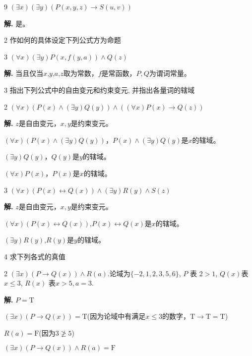 \documentclass[12pt]{article}
\newenvironment{firstlayer}%
{\begin{list}{}{\renewcommand{\makelabel}[1]{\textbf{##1}.\hfil}
}}
{\end{list}}
\newenvironment{secondlayer}%
{\begin{list}{}{\renewcommand{\makelabel}[1]{(##1)\hfil}
}}
{\end{list}}
\begin{document}
\begin{CJK}{UTF8}{gbsn}
\begin{firstlayer}
\begin{secondlayer}
    \item[9] \(( \exists x ) ( \exists y ) ( P ( x , y , z ) \rightarrow S( u , v) )\)

    \textbf{解.} 是。
  \end{secondlayer}
  \item[2] 作如何的具体设定下列公式方为命题

  \begin{secondlayer}
    \item[3] \(( \forall x ) ( \exists y ) P ( x , f ( y , a ) ) \wedge Q( z)\)

\textbf{解.} 当且仅当\(x\),\(y\),\(a\),\(z\)取为常数，\(f\)是常函数，\(P,Q\)为谓词常量。
  \end{secondlayer}
  \item[3] 指出下列公式中的自由变元和约束变元, 并指出各量词的辖域

  \begin{secondlayer}
    \item[2] \(( \forall x ) ( P ( x ) \wedge ( \exists y )Q( y ) ) \wedge ( ( \forall x ) P ( x ) \rightarrow Q( z) )\)

    \textbf{解.} \(z\)是自由变元，\(x,y\)是约束变元。

\(( \forall x ) ( P ( x ) \wedge ( \exists y )Q( y ) )\)，\(P ( x ) \wedge ( \exists y )Q( y )\)是\(x\)的辖域。

\(( \exists y )Q( y )\)，\(Q( y )\)是\(y\)的辖域。

\(( \forall x ) P ( x )\)，\(P ( x )\)是\(x\)的辖域。

    \item[3] \(( \forall x ) ( P ( x ) \leftrightarrow Q( x ) ) \wedge ( \exists y ) R( y ) \wedge S( z)\)

    \textbf{解.} \(z\)是自由变元，\(x,y\)是约束变元。

\(( \forall x ) ( P ( x ) \leftrightarrow Q( x ) )\),\(P ( x ) \leftrightarrow Q( x )\)是\(x\)的辖域。

\(( \exists y ) R( y )\),\(R( y )\)是\(y\)的辖域。
  \end{secondlayer}
  \item[4] 求下列各式的真值

  \begin{secondlayer}
    \item[2] \(( \exists x ) ( P\rightarrow Q( x ) ) \wedge R( a )\).论域为\(\{- 2, 1, 2, 3, 5, 6\}\),
\(P\) 表 \(2> 1\), \(Q( x )\)表 \(x \leq 3\), \(R( x )\)
表\(x > 5,a= 3\).

    \textbf{解.}
\(P=\text{T}\)

\((\exists x)(P\rightarrow Q( x ))=\text{T}\)(因为论域中有满足\(x \leq 3\)的数字，\(\text{T}\rightarrow \text{T}=\text{T}\))

\(R(a)=\text{F}\)(因为\(3 \ngeq 5\))

\(( \exists x ) ( P\rightarrow Q( x ) ) \wedge R( a )=\text{F}\)
  \end{secondlayer}
\end{firstlayer}


\end{CJK}
\end{document}

